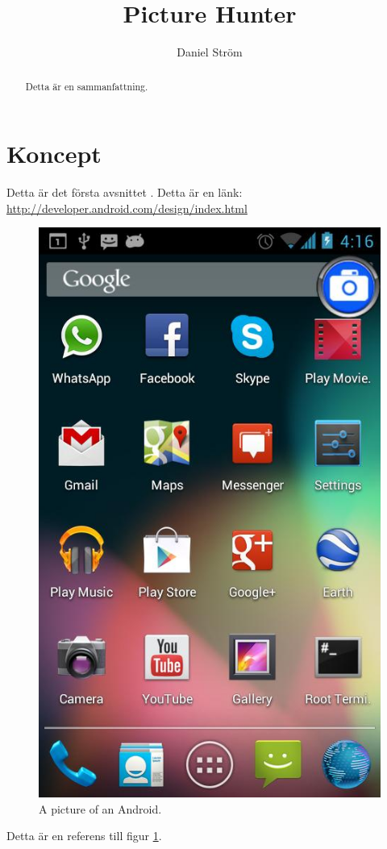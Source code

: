 \documentclass[11px, a4paper, twocolumn]{article}
\title{Picture Hunter}
\author{Daniel Ström \\ \mail{D@nielstrom.se}}
\begin{document}
\maketitle

\begin{abstract}
	Detta är en sammanfattning.
\end{abstract}

\tableofcontents

\listoffigures


\section{Koncept}
	Detta är det första avsnittet \cite{DesignGuidelines}. Detta är en länk: \url{http://developer.android.com/design/index.html}

    \begin{figure}
        \centering
        \includegraphics[width=\linewidth]{img/unnamed}
        \caption{\label{fig:android} A picture of an Android.}
    \end{figure}

    Detta är en referens till figur \ref{fig:android}.



\begingroup
\raggedright
\printbibliography
{}
\endgroup
\end{document}
